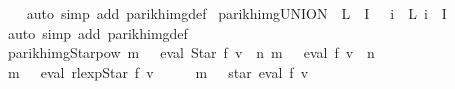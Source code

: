 \begin{isabellebody}
%
\isadelimproof
\ \ %
\endisadelimproof
%
\isatagproof
{}\isamarkupfalse%
\ {\isacharparenleft}{\kern0pt}auto\ simp\ add{\isacharcolon}{\kern0pt}\ parikh{\isacharunderscore}{\kern0pt}img{\isacharunderscore}{\kern0pt}def{\isacharparenright}{\kern0pt}%
\endisatagproof
{\isafoldproof}%
%
\isadelimproof
\isanewline
%
\endisadelimproof
\isanewline
{}\isamarkupfalse%
\ parikh{\isacharunderscore}{\kern0pt}img{\isacharunderscore}{\kern0pt}UNION{\isacharcolon}{\kern0pt}\ {\isachardoublequoteopen}{\isasymPsi}\ {\isacharparenleft}{\kern0pt}{\isasymUnion}{\isacharparenleft}{\kern0pt}L\ {\isacharbackquote}{\kern0pt}\ I{\isacharparenright}{\kern0pt}{\isacharparenright}{\kern0pt}\ {\isacharequal}{\kern0pt}\ {\isasymUnion}\ {\isacharparenleft}{\kern0pt}{\isacharparenleft}{\kern0pt}{\isasymlambda}i{\isachardot}{\kern0pt}\ {\isasymPsi}\ {\isacharparenleft}{\kern0pt}L\ i{\isacharparenright}{\kern0pt}{\isacharparenright}{\kern0pt}\ {\isacharbackquote}{\kern0pt}\ I{\isacharparenright}{\kern0pt}{\isachardoublequoteclose}\isanewline
%
\isadelimproof
\ \ %
\endisadelimproof
%
\isatagproof
{}\isamarkupfalse%
\ {\isacharparenleft}{\kern0pt}auto\ simp\ add{\isacharcolon}{\kern0pt}\ parikh{\isacharunderscore}{\kern0pt}img{\isacharunderscore}{\kern0pt}def{\isacharparenright}{\kern0pt}%
\endisatagproof
{\isafoldproof}%
%
\isadelimproof
\isanewline
%
\endisadelimproof
\isanewline
{}\isamarkupfalse%
\ parikh{\isacharunderscore}{\kern0pt}img{\isacharunderscore}{\kern0pt}Star{\isacharunderscore}{\kern0pt}pow{\isacharcolon}{\kern0pt}\ {\isachardoublequoteopen}m\ {\isasymin}\ {\isasymPsi}\ {\isacharparenleft}{\kern0pt}eval\ {\isacharparenleft}{\kern0pt}Star\ f{\isacharparenright}{\kern0pt}\ v{\isacharparenright}{\kern0pt}\ {\isasymLongrightarrow}\ {\isasymexists}n{\isachardot}{\kern0pt}\ m\ {\isasymin}\ {\isasymPsi}\ {\isacharparenleft}{\kern0pt}eval\ f\ v\ {\isacharcircum}{\kern0pt}{\isacharcircum}{\kern0pt}\ n{\isacharparenright}{\kern0pt}{\isachardoublequoteclose}\isanewline
%
\isadelimproof
%
\endisadelimproof
%
\isatagproof
{}\isamarkupfalse%
\ {\isacharminus}{\kern0pt}\isanewline
\ \ \isamarkupfalse%
\ {\isachardoublequoteopen}m\ {\isasymin}\ {\isasymPsi}\ {\isacharparenleft}{\kern0pt}eval\ {\isacharparenleft}{\kern0pt}rlexp{\isachardot}{\kern0pt}Star\ f{\isacharparenright}{\kern0pt}\ v{\isacharparenright}{\kern0pt}{\isachardoublequoteclose}\isanewline
\ \ \isamarkupfalse%
\ \isamarkupfalse%
\ {\isachardoublequoteopen}m\ {\isasymin}\ {\isasymPsi}\ {\isacharparenleft}{\kern0pt}star\ {\isacharparenleft}{\kern0pt}eval\ f\ v{\isacharparenright}{\kern0pt}{\isacharparenright}{\kern0pt}{\isachardoublequoteclose}\ \isamarkupfalse%

\end{isabellebody}

